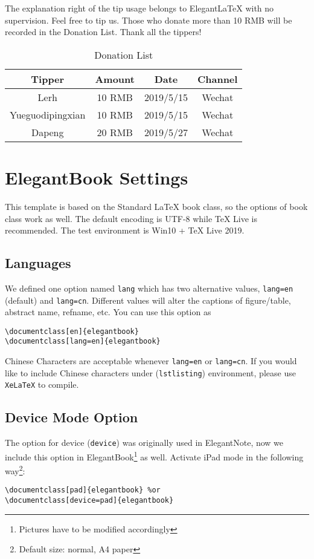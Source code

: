\documentclass[fancy,blue,11pt]{elegantbook}
\begin{document}
The explanation right of the tip usage belongs to Elegant\LaTeX{} with no supervision. Feel free to tip us. Those who donate more than 10 RMB will be recorded in the Donation List. Thank all the tippers!
\begin{table}[htbp]
	\centering
	\caption{Donation List}
	\begin{tabular}{cccc}
		\toprule
		Tipper   & Amount & Date & Channel \\
		\midrule
		Lerh  & 10 RMB  & 2019/5/15 & Wechat \\
		Yueguodipingxian & 10 RMB   & 2019/5/15 & Wechat \\
		Dapeng & 20 RMB & 2019/5/27 & Wechat\\
		\bottomrule
	\end{tabular}%
\end{table}%

\chapter{ElegantBook Settings}

This template is based on the Standard \LaTeX{} book class, so the options of book class work as well. The default encoding is UTF-8 while \TeX{} Live is recommended. The test environment is Win10 + \TeX{} Live 2019. 


\section{Languages}
We defined one option named \lstinline{lang} which has two alternative values, \lstinline{lang=en} (default) and \lstinline{lang=cn}. Different values will alter the captions of figure/table, abstract name, refname, etc. You can use this option as
\begin{lstlisting}
\documentclass[en]{elegantbook} 
\documentclass[lang=en]{elegantbook}
\end{lstlisting}

\begin{remark}
Chinese Characters  are acceptable whenever \lstinline{lang=en} or \lstinline{lang=cn}. If you would like to include Chinese characters under (\lstinline{lstlisting}) environment, please use \lstinline{XeLaTeX} to compile.
\end{remark}

\section{Device Mode Option}
The option for device (\lstinline{device}) was originally used in ElegantNote, now we include this option in ElegantBook\footnote{Pictures have to be modified accordingly} as well. Activate iPad mode in the following way\footnote{Default size: normal, A4 paper}:
\begin{lstlisting}
\documentclass[pad]{elegantbook} %or
\documentclass[device=pad]{elegantbook}
\end{lstlisting}
\end{document}
